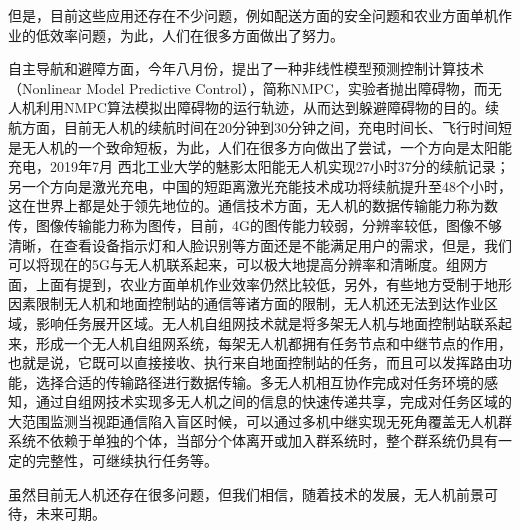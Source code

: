 \documentclass{article}
\begin{document}
但是，目前这些应用还存在不少问题，例如配送方面的安全问题和农业方面单机作业的低效率问题，为此，人们在很多方面做出了努力。\par
自主导航和避障方面，今年八月份，提出了一种非线性模型预测控制计算技术（Nonlinear Model Predictive Control），简称NMPC，实验者抛出障碍物，而无人机利用NMPC算法模拟出障碍物的运行轨迹，从而达到躲避障碍物的目的。续航方面，目前无人机的续航时间在20分钟到30分钟之间，充电时间长、飞行时间短是无人机的一个致命短板，为此，人们在很多方向做出了尝试，一个方向是太阳能充电，2019年7月 西北工业大学的魅影太阳能无人机实现27小时37分的续航记录；另一个方向是激光充电，中国的短距离激光充能技术成功将续航提升至48个小时，这在世界上都是处于领先地位的。通信技术方面，无人机的数据传输能力称为数传，图像传输能力称为图传，目前，4G的图传能力较弱，分辨率较低，图像不够清晰，在查看设备指示灯和人脸识别等方面还是不能满足用户的需求，但是，我们可以将现在的5G与无人机联系起来，可以极大地提高分辨率和清晰度。组网方面，上面有提到，农业方面单机作业效率仍然比较低，另外，有些地方受制于地形因素限制无人机和地面控制站的通信等诸方面的限制，无人机还无法到达作业区域，影响任务展开区域。无人机自组网技术就是将多架无人机与地面控制站联系起来，形成一个无人机自组网系统，每架无人机都拥有任务节点和中继节点的作用，也就是说，它既可以直接接收、执行来自地面控制站的任务，而且可以发挥路由功能，选择合适的传输路径进行数据传输。多无人机相互协作完成对任务环境的感知，通过自组网技术实现多无人机之间的信息的快速传递共享，完成对任务区域的大范围监测当视距通信陷入盲区时候，可以通过多机中继实现无死角覆盖无人机群系统不依赖于单独的个体，当部分个体离开或加入群系统时，整个群系统仍具有一定的完整性，可继续执行任务等。\par
虽然目前无人机还存在很多问题，但我们相信，随着技术的发展，无人机前景可待，未来可期。
\end{document}
